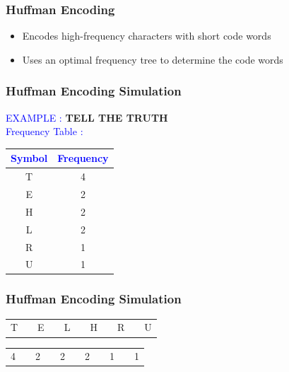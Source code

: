 \documentclass{beamer}
\begin{document}
\begin{frame}
 \frametitle{\textbf{Huffman Encoding}}
 \begin{itemize}
  \item Encodes high-frequency characters with short code words
  \item Uses an optimal frequency tree to determine the code words
 \end{itemize}
\end{frame}

\begin{frame}
 \frametitle{\textbf{Huffman Encoding Simulation}}
 \textcolor{blue}{EXAMPLE : } \textbf{TELL THE TRUTH}
 \\
 \textcolor{blue}{Frequency Table : }
 \begin{center}
\begin{tabular}{| c | c |}
 \hline
  \textcolor{blue}{Symbol} & \textcolor{blue}{Frequency} \\ \hline  
  T & 4 \\ \hline
 E & 2 \\ \hline  
 H & 2 \\ \hline  
  L & 2 \\ \hline 
   R & 1 \\ \hline  
    U & 1 \\ \hline  
\end{tabular} 
\end{center} 
\end{frame}


\begin{frame}
\frametitle{\textbf{Huffman Encoding Simulation}}

 
\begin{tabular}{| p{0.25cm} | p{0.25cm} | p{0.25cm} | p{0.25cm} | p{0.25cm} | p{0.25cm} | p{0.25cm} | p{0.25cm} | p{0.25cm} | p{0.25cm} | p{0.25cm} |}

\cline{1-1} \cline{3-3} \cline{5-5} \cline{7-7} \cline{9-9} \cline{11-11}

 T && E & & L & & H & & R & & U \\

\cline{1-1} \cline{3-3} \cline{5-5} \cline{7-7} \cline{9-9} \cline{11-11}

\end{tabular} 

\begin{tabular}{p{0.25cm} p{0.25cm} p{0.25cm} p{0.25cm} p{0.25cm} p{0.25cm} p{0.25cm} p{0.25cm} p{0.25cm} p{0.25cm} p{0.25cm}}

4 & & 2 & & 2 & & 2 & & 1 & & 1\\
 
\end{tabular} 
\end{frame}
\end{document}
